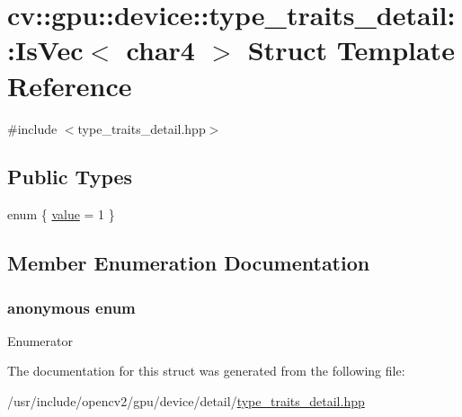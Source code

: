 \hypertarget{structcv_1_1gpu_1_1device_1_1type__traits__detail_1_1IsVec_3_01char4_01_4}{\section{cv\-:\-:gpu\-:\-:device\-:\-:type\-\_\-traits\-\_\-detail\-:\-:Is\-Vec$<$ char4 $>$ Struct Template Reference}
\label{structcv_1_1gpu_1_1device_1_1type__traits__detail_1_1IsVec_3_01char4_01_4}
}


{\ttfamily \#include $<$type\-\_\-traits\-\_\-detail.\-hpp$>$}

\subsection*{Public Types}
\begin{DoxyCompactItemize}
\item 
enum \{ \hyperlink{structcv_1_1gpu_1_1device_1_1type__traits__detail_1_1IsVec_3_01char4_01_4_aff8bf8c1b7744187c8e1e01e031f4b2ca33a6bbf4d738a47d2289cb4afa473fc4}{value} = 1
 \}
\end{DoxyCompactItemize}


\subsection{Member Enumeration Documentation}
\hypertarget{structcv_1_1gpu_1_1device_1_1type__traits__detail_1_1IsVec_3_01char4_01_4_aff8bf8c1b7744187c8e1e01e031f4b2c}{\subsubsection[{anonymous enum}]{\setlength{\rightskip}{0pt plus 5cm}anonymous enum}}\label{structcv_1_1gpu_1_1device_1_1type__traits__detail_1_1IsVec_3_01char4_01_4_aff8bf8c1b7744187c8e1e01e031f4b2c}
\begin{Desc}
\item[Enumerator]\par
\begin{description}
\item[{\em 
\hypertarget{structcv_1_1gpu_1_1device_1_1type__traits__detail_1_1IsVec_3_01char4_01_4_aff8bf8c1b7744187c8e1e01e031f4b2ca33a6bbf4d738a47d2289cb4afa473fc4}{value}\label{structcv_1_1gpu_1_1device_1_1type__traits__detail_1_1IsVec_3_01char4_01_4_aff8bf8c1b7744187c8e1e01e031f4b2ca33a6bbf4d738a47d2289cb4afa473fc4}
}]\end{description}
\end{Desc}


The documentation for this struct was generated from the following file\-:\begin{DoxyCompactItemize}
\item 
/usr/include/opencv2/gpu/device/detail/\hyperlink{type__traits__detail_8hpp}{type\-\_\-traits\-\_\-detail.\-hpp}\end{DoxyCompactItemize}
